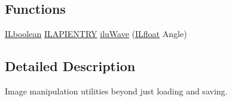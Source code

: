\subsection*{Functions}
\begin{DoxyCompactItemize}
\item 
\hyperlink{group__il__types_gaa6aa7c95cfdc06b4d8601ef832b7bb0a}{I\+Lboolean} \hyperlink{_i_l_8h_a69c08a8d06df986f7e46f209d131ef2f}{I\+L\+A\+P\+I\+E\+N\+T\+R\+Y} \hyperlink{group___i_l_u_ga6284913f73663fb22acc0b4b2c49a5e2}{ilu\+Wave} (\hyperlink{group__il__types_ga376156c9461893f4b1a5de9579dc86f2}{I\+Lfloat} Angle)
\end{DoxyCompactItemize}


\subsection{Detailed Description}
Image manipulation utilities beyond just loading and saving. 




